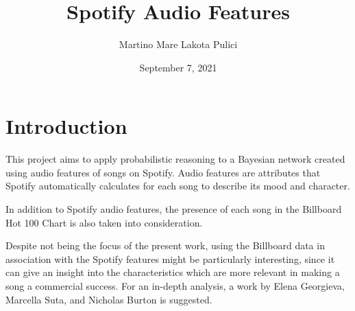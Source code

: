 \documentclass[a4paper, 12pt]{article}
\begin{document}
\title{Spotify Audio Features}
\author{Martino Mare Lakota Pulici}
\date{September 7, 2021}
\maketitle
\begin{center}
\end{center}


\clearpage


\tableofcontents


\clearpage


\listoffigures


\clearpage


\section{Introduction}

This project aims to apply probabilistic reasoning to a Bayesian network created using audio features of songs on Spotify. Audio features are attributes that Spotify automatically calculates for each song to describe its mood and character.

In addition to Spotify audio features, the presence of each song in the Billboard Hot 100 Chart \cite{hot-100} is also taken into consideration.

Despite not being the focus of the present work, using the Billboard data in association with the Spotify features might be particularly interesting, since it can give an insight into the characteristics which are more relevant in making a song a commercial success. For an in-depth analysis, a work by Elena Georgieva, Marcella Suta, and Nicholas Burton \cite{hitpredict-presentation, hitpredict-report} is suggested.
\end{document}
